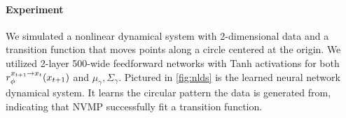 \paragraph{Experiment} We simulated a nonlinear dynamical system
with 2-dimensional data and a transition function
that moves points along a circle centered at the origin.
We utilized 2-layer 500-wide feedforward networks with Tanh activations
for both $r^{x_{t + 1} \rightarrow x_t}_\phi(x_{t + 1})$ and $\mu_\gamma, \Sigma_\gamma$.
Pictured in \autoref{fig:nlds} is the learned neural network dynamical system.
It learns the circular pattern the data is generated from, indicating
that NVMP successfully fit a transition function.

%
%
%

